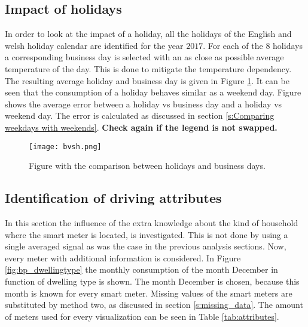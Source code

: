 \subsection{Impact of holidays}
In order to look at the impact of a holiday, all the holidays of the English and welsh holiday calendar are identified for the year $ 2017 $. For each of the $ 8 $ holidays a corresponding business day is selected with an as close as possible average temperature of the day. This is done to mitigate the temperature dependency. The resulting average holiday and business day is given in Figure \ref{fig:bvsh}. It can be seen that the consumption of a holiday behaves similar as a weekend day. Figure shows the average error between a holiday vs business day and a holiday vs weekend day. The error is calculated as discussed in section \ref{s:Comparing weekdays with weekends}.    \textbf{Check again if the legend is not swapped.}

\begin{figure}[h!]
	\centering
	\texttt{[image: bvsh.png]}
	\caption{Figure with the comparison between holidays and business days.}
	\label{fig:bvsh}
\end{figure}



\subsection{Identification of driving attributes} \label{s:Identification of driving attributes}
In this section the influence of the extra knowledge about the kind of household where the smart meter is located, is investigated. This is not done by using a single averaged signal as was the case in the previous analysis sections. Now, every meter with additional information is considered. In Figure \ref{fig:bp_dwellingtype} the monthly consumption of the month December in function of dwelling type is shown. The month December is chosen, because this month is known for every smart meter. Missing values of the smart meters are substituted by method two, as discussed in section \ref{s:missing_data}. The amount of meters used for every visualization can be seen in Table \ref{tab:attributes}.


